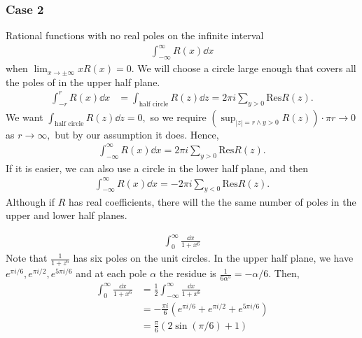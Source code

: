 \documentclass[a4paper,12pt]{article}
\begin{document}
\subsubsection{Case 2}
Rational functions with no real poles on the infinite interval \begin{align}
    \int_{-\infty}^\infty R(x)\dd x
\end{align}
when $\lim_{x\to\pm\infty}xR(x)=0.$ We will choose a circle large enough that covers all the poles of in the upper half plane. \begin{align}
    \int_{-r}^rR(x)\dd x&=\int_{\text{half circle}}R(z)\dd z=2\pi i\sum_{y>0}\mathrm{Res}R(z).
\end{align}
We want $\int_{\text{half circle}}R(z)\dd z=0,$ so we require $(\sup_{|z|=r\land y>0}R(z))\cdot\pi r\to 0$ as $r\to\infty,$ but by our assumption it does. Hence, \begin{align}
    \int_{-\infty}^\infty R(x)\dd x=2\pi i\sum_{y>0}\mathrm{Res}R(z).
\end{align}
If it is easier, we can also use a circle in the lower half plane, and then \begin{align}
    \int_{-\infty}^\infty R(x)\dd x=-2\pi i\sum_{y<0}\mathrm{Res}R(z).
\end{align}
Although if $R$ has real coefficients, there will the the same number of poles in the upper and lower half planes.
\begin{example}
    \begin{align}
        \int_{0}^\infty\frac{\dd x}{1+x^6}
    \end{align}
    Note that $\frac{1}{1+z^6}$ has six poles on the unit circles. In the upper half plane, we have $e^{\pi i/6},e^{\pi i/2},e^{5\pi i/6}$ and at each pole $\alpha$ the residue is $\frac{1}{6\alpha^5}=-\alpha/6.$ Then, \begin{align}
        \int_{0}^\infty\frac{\dd x}{1+x^6}&=\frac{1}{2}\int_{-\infty}^\infty\frac{\dd x}{1+x^6}\\
        &=-\frac{\pi i}{6}\left(e^{\pi i/6}+e^{\pi i/2}+e^{5\pi i/6}\right)\\
        &=\frac{\pi}{6}\left(2\sin(\pi/6)+1\right)
    \end{align}
\end{example}
\end{document}
